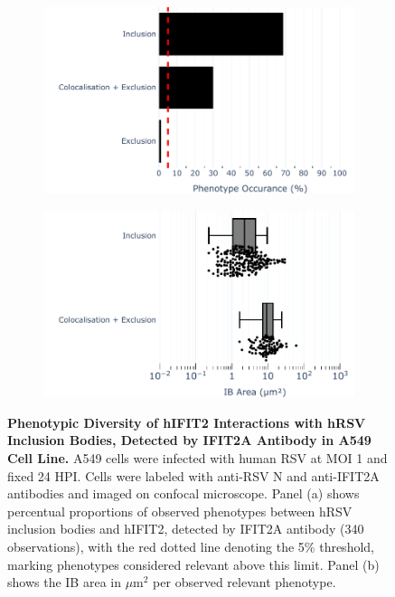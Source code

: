 \begin{figure}
    \begin{subfigure}{0.495\textwidth}
        \caption{}
        \includegraphics[width=1\linewidth]{08. Chapter 3/Figs/02. Infection/02. IFIT2/01. IFIT2A/01. bar_i2a_a549.pdf}
    \end{subfigure}
    \begin{subfigure}{0.495\textwidth}
        \caption{}
        \includegraphics[width=1\linewidth]{08. Chapter 3/Figs/02. Infection/02. IFIT2/01. IFIT2A/02. box_i2a_a549.pdf}
    \end{subfigure}
    \caption[Phenotypic Diversity of hIFIT2 Interactions with hRSV Inclusion Bodies, Detected by IFIT2A Antibody in A549 Cell Line.]{\textbf{Phenotypic Diversity of hIFIT2 Interactions with hRSV Inclusion Bodies, Detected by IFIT2A Antibody in A549 Cell Line.} A549 cells were infected with human RSV at MOI 1 and fixed 24 HPI. Cells were labeled with anti-RSV N and anti-IFIT2A antibodies and imaged on confocal microscope. Panel (a) shows percentual proportions of observed phenotypes between hRSV inclusion bodies and hIFIT2, detected by IFIT2A antibody (340 observations), with the red dotted line denoting the 5\% threshold, marking phenotypes considered relevant above this limit. Panel (b) shows the IB area in \(\mu \mbox{m}^2\) per observed relevant phenotype.}
    \label{fig:Phenotypic Diversity of hIFIT2 Interactions with hRSV Inclusion Bodies, Detected by IFIT2A Antibody in A549 Cell Line}
\end{figure}

